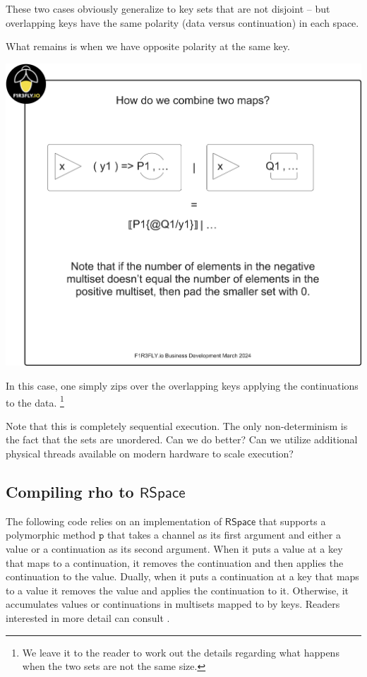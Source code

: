 These two cases obviously generalize to key sets that are not disjoint
-- but overlapping keys have the same polarity (data versus
continuation) in each space.

What remains is when we have opposite polarity at the same key.


\includegraphics[scale=0.25]{RHO20RSpaceSlide7.pdf}

In this case, one simply zips over the overlapping keys applying the
continuations to the data. \footnote{We leave it to the reader to work
  out the details regarding what happens when the two sets are not the
  same size.}

Note that this is completely sequential execution. The only
non-determinism is the fact that the sets are unordered. Can we do
better? Can we utilize additional physical threads available on modern
hardware to scale execution?

\subsection{Compiling rho to $\mathsf{RSpace}$}

The following code relies on an implementation of $\mathsf{RSpace}$
that supports a polymorphic method $\texttt{p}$ that takes a channel
as its first argument and either a value or a continuation as its
second argument. When it puts a value at a key that maps to a
continuation, it removes the continuation and then applies the
continuation to the value. Dually, when it puts a continuation at a
key that maps to a value it removes the value and applies the
continuation to it. Otherwise, it accumulates values or continuations
in multisets mapped to by keys. Readers interested in more detail can
consult \cite{f1r3fly-io:githubrepo}. \\

